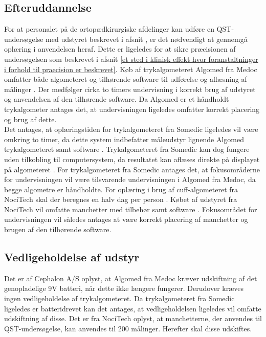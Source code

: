 \subsection{Efteruddannelse}
For at personalet på de ortopædkirurgiske afdelinger kan udføre en QST-undersøgelse med udstyret beskrevet i afsnit , er det nødvendigt at gennemgå oplæring i anvendelsen heraf. Dette er ligeledes for at sikre præcisionen af undersøgelsen som beskrevet i afsnit \ref{et sted i klinisk effekt hvor foranstaltninger i forhold til praecision er beskrevet}. Køb af trykalgometeret Algomed fra Medoc omfatter både algometeret og tilhørende software til udførelse og aflæsning af målinger \citep{AlgomedData}. Der medfølger cirka to timers undervisning i korrekt brug af udstyret og anvendelsen af den tilhørende software. Da Algomed er et håndholdt trykalgometer antages det, at undervisningen ligeledes omfatter korrekt placering og brug af dette. \\
Det antages, at oplæringstiden for trykalgometeret fra Somedic ligeledes vil være omkring to timer, da dette system indbefatter måleudstyr lignende Algomed trykalgometeret samt software \citep{SomedicSenselab2016}. Trykalgometeret fra Somedic kan dog fungere uden tilkobling til computersystem, da resultatet kan aflæses direkte på displayet på algometeret \citep{SomedicSenselab2016}. For trykalgometeret fra Somedic antages det, at fokusområderne for undervisningen vil være tilsvarende undervisningen i Algomed fra Medoc, da begge algometre er håndholdte.
For oplæring i brug af cuff-algometeret fra NociTech skal der beregnes en halv dag per person \citep{mail_fra_nocitech}. Købet af udstyret fra NociTech vil omfatte manchetter med tilbehør samt software \citep{NociTech2016}. Fokusområdet for undervisningen vil således antages at være korrekt placering af manchetter og brugen af den tilhørende software.   


\subsection{Vedligeholdelse af udstyr}
Det er af Cephalon A/S oplyst, at Algomed fra Medoc kræver udskiftning af det genopladelige 9V batteri, når dette ikke længere fungerer. Derudover kræves ingen vedligeholdelse af trykalgometeret. Da trykalgometeret fra Somedic ligeledes er batteridrevet kan det antages, at vedligeholdelsen ligeledes vil omfatte udskiftning af disse. 
Det er fra NociTech oplyst, at manchetterne, der anvendes til QST-undersøgelse, kan anvendes til 200 målinger. Herefter skal disse udskiftes.


